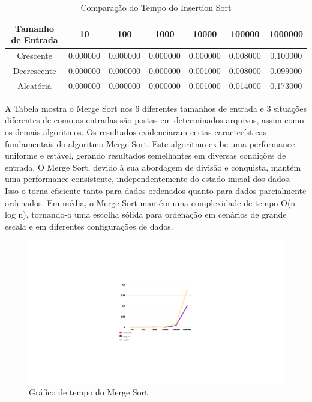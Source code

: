 \begin{table}[h]
    \centering
    \caption{Comparação do Tempo do Insertion Sort}
    \begin{tabular}{|c|c|c|c|c|c|c|}
        \hline
        Tamanho de Entrada & 10 & 100 & 1000 & 10000 & 100000 & 1000000 \\
        \hline
        Crescente & 0.000000 & 0.000000 & 0.000000 & 0.000000 & 0.008000 & 0.100000 \\
        \hline
        Decrescente & 0.000000 & 0.000000 & 0.000000 & 0.001000 & 0.008000 & 0.099000 \\
        \hline
        Aleatória & 0.000000 & 0.000000 & 0.000000 & 0.001000 & 0.014000 & 0.173000 \\
        \hline
    \end{tabular}
    \label{tab:comparacao}
\end{table}

A Tabela mostra o Merge Sort nos 6 diferentes tamanhos de entrada e 3 situações diferentes de como as entradas são postas em determinados arquivos, assim como os demais algoritmos. Os resultados evidenciaram certas características fundamentais do algoritmo Merge Sort. Este algoritmo exibe uma performance uniforme e estável, gerando resultados semelhantes em diversas condições de entrada. O Merge Sort, devido à sua abordagem de divisão e conquista, mantém uma performance consistente, independentemente do estado inicial dos dados. Isso o torna eficiente tanto para dados ordenados quanto para dados parcialmente ordenados. Em média, o Merge Sort mantém uma complexidade de tempo O(n log n), tornando-o uma escolha sólida para ordenação em cenários de grande escala e em diferentes configurações de dados.

 \begin{figure}[H]
    \centering
    \includegraphics[width = 20cm]{Imagens/Merge Sort/merge.png}
    \caption{Gráfico de tempo do Merge Sort. }
    \label{imagem_digrama}
\end{figure}


